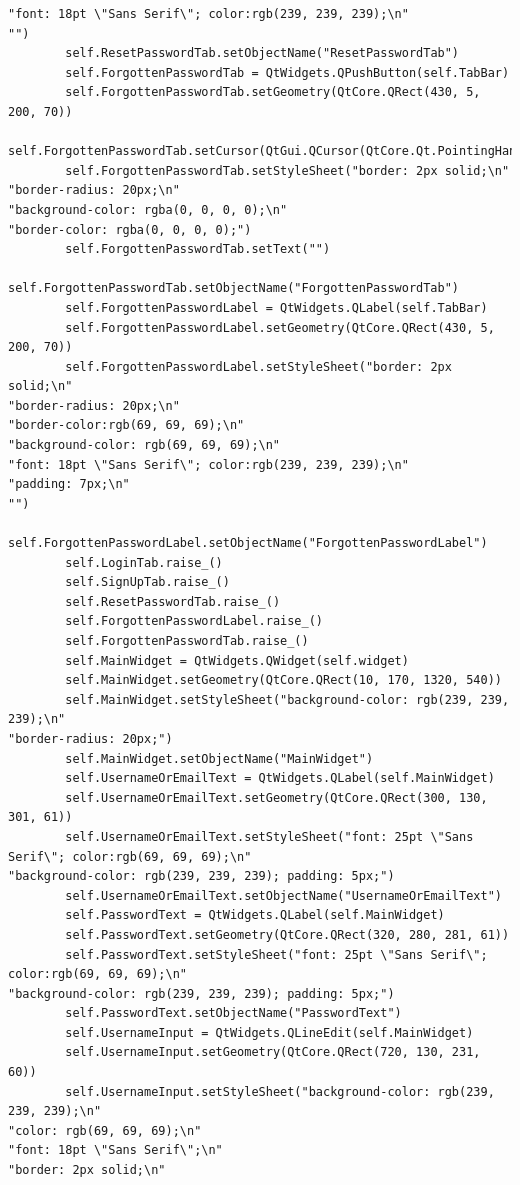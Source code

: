 \documentclass{article}
\begin{document}
\begin{lstlisting}
"font: 18pt \"Sans Serif\"; color:rgb(239, 239, 239);\n"
"")
        self.ResetPasswordTab.setObjectName("ResetPasswordTab")
        self.ForgottenPasswordTab = QtWidgets.QPushButton(self.TabBar)
        self.ForgottenPasswordTab.setGeometry(QtCore.QRect(430, 5, 200, 70))
        self.ForgottenPasswordTab.setCursor(QtGui.QCursor(QtCore.Qt.PointingHandCursor))
        self.ForgottenPasswordTab.setStyleSheet("border: 2px solid;\n"
"border-radius: 20px;\n"
"background-color: rgba(0, 0, 0, 0);\n"
"border-color: rgba(0, 0, 0, 0);")
        self.ForgottenPasswordTab.setText("")
        self.ForgottenPasswordTab.setObjectName("ForgottenPasswordTab")
        self.ForgottenPasswordLabel = QtWidgets.QLabel(self.TabBar)
        self.ForgottenPasswordLabel.setGeometry(QtCore.QRect(430, 5, 200, 70))
        self.ForgottenPasswordLabel.setStyleSheet("border: 2px solid;\n"
"border-radius: 20px;\n"
"border-color:rgb(69, 69, 69);\n"
"background-color: rgb(69, 69, 69);\n"
"font: 18pt \"Sans Serif\"; color:rgb(239, 239, 239);\n"
"padding: 7px;\n"
"")
        self.ForgottenPasswordLabel.setObjectName("ForgottenPasswordLabel")
        self.LoginTab.raise_()
        self.SignUpTab.raise_()
        self.ResetPasswordTab.raise_()
        self.ForgottenPasswordLabel.raise_()
        self.ForgottenPasswordTab.raise_()
        self.MainWidget = QtWidgets.QWidget(self.widget)
        self.MainWidget.setGeometry(QtCore.QRect(10, 170, 1320, 540))
        self.MainWidget.setStyleSheet("background-color: rgb(239, 239, 239);\n"
"border-radius: 20px;")
        self.MainWidget.setObjectName("MainWidget")
        self.UsernameOrEmailText = QtWidgets.QLabel(self.MainWidget)
        self.UsernameOrEmailText.setGeometry(QtCore.QRect(300, 130, 301, 61))
        self.UsernameOrEmailText.setStyleSheet("font: 25pt \"Sans Serif\"; color:rgb(69, 69, 69);\n"
"background-color: rgb(239, 239, 239); padding: 5px;")
        self.UsernameOrEmailText.setObjectName("UsernameOrEmailText")
        self.PasswordText = QtWidgets.QLabel(self.MainWidget)
        self.PasswordText.setGeometry(QtCore.QRect(320, 280, 281, 61))
        self.PasswordText.setStyleSheet("font: 25pt \"Sans Serif\"; color:rgb(69, 69, 69);\n"
"background-color: rgb(239, 239, 239); padding: 5px;")
        self.PasswordText.setObjectName("PasswordText")
        self.UsernameInput = QtWidgets.QLineEdit(self.MainWidget)
        self.UsernameInput.setGeometry(QtCore.QRect(720, 130, 231, 60))
        self.UsernameInput.setStyleSheet("background-color: rgb(239, 239, 239);\n"
"color: rgb(69, 69, 69);\n"
"font: 18pt \"Sans Serif\";\n"
"border: 2px solid;\n"

\end{lstlisting}
\end{document}
